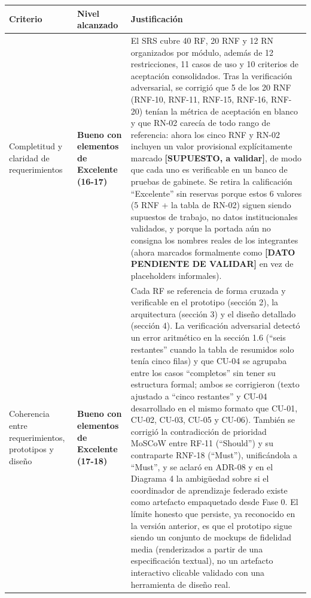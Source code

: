 \documentclass[11pt,a4paper]{article}
\begin{document}
{\small
\begin{longtable}[]{@{}
  >{\raggedright\arraybackslash}p{}
  >{\raggedright\arraybackslash}p{}
  >{\raggedright\arraybackslash}p{}@{}}
\toprule\noalign{}
\begin{minipage}[b]{\linewidth}\raggedright
Criterio
\end{minipage} & \begin{minipage}[b]{\linewidth}\raggedright
Nivel alcanzado
\end{minipage} & \begin{minipage}[b]{\linewidth}\raggedright
Justificación
\end{minipage} \\
\midrule\noalign{}
\endhead
\bottomrule\noalign{}
\endlastfoot
Completitud y claridad de requerimientos & \textbf{Bueno con elementos de Excelente (16-17)} & El SRS cubre 40 RF, 20 RNF y 12 RN organizados por módulo, además de 12 restricciones, 11 casos de uso y 10 criterios de aceptación consolidados. Tras la verificación adversarial, se corrigió que 5 de los 20 RNF (RNF-10, RNF-11, RNF-15, RNF-16, RNF-20) tenían la métrica de aceptación en blanco y que RN-02 carecía de todo rango de referencia: ahora los cinco RNF y RN-02 incluyen un valor provisional explícitamente marcado \textbf{{[}SUPUESTO, a validar{]}}, de modo que cada uno es verificable en un banco de pruebas de gabinete. Se retira la calificación ``Excelente'' sin reservas porque estos 6 valores (5 RNF + la tabla de RN-02) siguen siendo supuestos de trabajo, no datos institucionales validados, y porque la portada aún no consigna los nombres reales de los integrantes (ahora marcados formalmente como \textbf{{[}DATO PENDIENTE DE VALIDAR{]}} en vez de placeholders informales). \\
Coherencia entre requerimientos, prototipos y diseño & \textbf{Bueno con elementos de Excelente (17-18)} & Cada RF se referencia de forma cruzada y verificable en el prototipo (sección 2), la arquitectura (sección 3) y el diseño detallado (sección 4). La verificación adversarial detectó un error aritmético en la sección 1.6 (``seis restantes'' cuando la tabla de resumidos solo tenía cinco filas) y que CU-04 se agrupaba entre los casos ``completos'' sin tener su estructura formal; ambos se corrigieron (texto ajustado a ``cinco restantes'' y CU-04 desarrollado en el mismo formato que CU-01, CU-02, CU-03, CU-05 y CU-06). También se corrigió la contradicción de prioridad MoSCoW entre RF-11 (``Should'') y su contraparte RNF-18 (``Must''), unificándola a ``Must'', y se aclaró en ADR-08 y en el Diagrama 4 la ambigüedad sobre si el coordinador de aprendizaje federado existe como artefacto empaquetado desde Fase 0. El límite honesto que persiste, ya reconocido en la versión anterior, es que el prototipo sigue siendo un conjunto de mockups de fidelidad media (renderizados a partir de una especificación textual), no un artefacto interactivo clicable validado con una herramienta de diseño real. \\

\end{longtable}}
\end{document}

